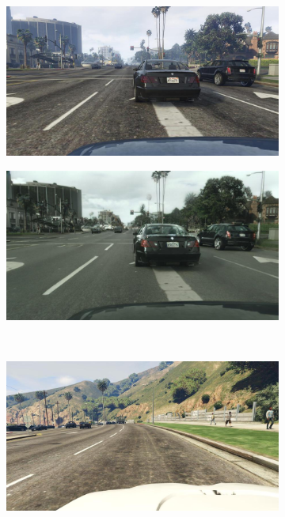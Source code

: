 \documentclass[%
    corpo=12pt,
    twoside,
    stile=classica,   
    tipotesi=magistrale,
    evenboxes,
    english,
	numerazioneromana,
]{toptesi}
\begin{document}
\begin{figure}[ht!]
	\captionsetup[subfigure]{labelformat=empty}
	\centering
	\begin{subfigure}{.47\textwidth}
		\centering
		\includegraphics[width=\textwidth]{imgs/gta1.jpg}
	\end{subfigure}%
	\hspace{.02\linewidth}
	\begin{subfigure}{.47\textwidth}
		\centering
		\includegraphics[width=\textwidth]{imgs/res1.jpg}
	\end{subfigure}\\
	\begin{subfigure}{.47\textwidth}
		\centering
		\includegraphics[width=\textwidth]{imgs/gta2.jpg}

\end{subfigure}
\end{figure}
\end{document}
